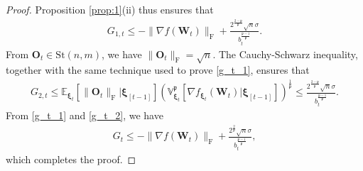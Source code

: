 \documentclass[twoside,11pt]{article}
\begin{document}
\begin{proof}
Proposition \ref{prop:1}(ii) thus ensures that 
\begin{align}\label{g_t_1}
G_{1,t} 
\leq 
- \| \nabla f (\bm{W}_t) \|_{\mathrm{F}}
+ \frac{2^{\frac{2 - \mathfrak{p}}{\mathfrak{p}}} \sqrt{n} \sigma}{b_t^{\frac{\mathfrak{p} -1}{\mathfrak{p}}}}.
\end{align}
From $\bm{O}_t \in \mathrm{St}(n,m)$, we have $\| \bm{O}_t \|_{\mathrm{F}} = \sqrt{n}$. The Cauchy-Schwarz inequality, together with the same technique used to prove \eqref{g_t_1}, ensures that 
\begin{align}\label{g_t_2} 
G_{2,t} \leq \mathbb{E}_{\bm{\xi}_t} \left[ \| \bm{O}_t  \|_{\mathrm{F}} | \bm{\xi}_{[t-1]} \right] \left( \mathbb{V}_{\bm{\xi}_t}^{\mathfrak{p}} \left[ \nabla f_{\bm{\xi}_t} (\bm{W}_t)  | \bm{\xi}_{[t-1]} \right] \right)^{\frac{1}{\mathfrak{p}}}
\leq  
\frac{2^{\frac{2 - \mathfrak{p}}{\mathfrak{p}}} \sqrt{n} \sigma}{b_t^{\frac{\mathfrak{p} -1}{\mathfrak{p}}}}.
\end{align}
From \eqref{g_t_1} and \eqref{g_t_2}, we have 
\begin{align}\label{G_T}
G_t 
\leq 
- \| \nabla f (\bm{W}_t) \|_{\mathrm{F}}
+ 
\frac{2^{\frac{2}{\mathfrak{p}}} \sqrt{n} \sigma}{b_t^{\frac{\mathfrak{p} -1}{\mathfrak{p}}}},
\end{align}
which completes the proof.


\end{proof}
\end{document}
